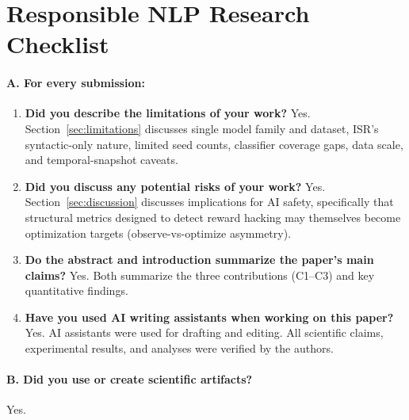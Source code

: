 \section*{Responsible NLP Research Checklist}

\paragraph{A. For every submission:}

\begin{enumerate}[label=A\arabic*.,leftmargin=*]
\item \textbf{Did you describe the limitations of your work?}
Yes. Section~\ref{sec:limitations} discusses single model family and dataset, ISR's syntactic-only nature, limited seed counts, classifier coverage gaps, data scale, and temporal-snapshot caveats.

\item \textbf{Did you discuss any potential risks of your work?}
Yes. Section~\ref{sec:discussion} discusses implications for AI safety, specifically that structural metrics designed to detect reward hacking may themselves become optimization targets (observe-vs-optimize asymmetry).

\item \textbf{Do the abstract and introduction summarize the paper's main claims?}
Yes. Both summarize the three contributions (C1--C3) and key quantitative findings.

\item \textbf{Have you used AI writing assistants when working on this paper?}
Yes. AI assistants were used for drafting and editing. All scientific claims, experimental results, and analyses were verified by the authors.
\end{enumerate}

\paragraph{B. Did you use or create scientific artifacts?}
Yes.

